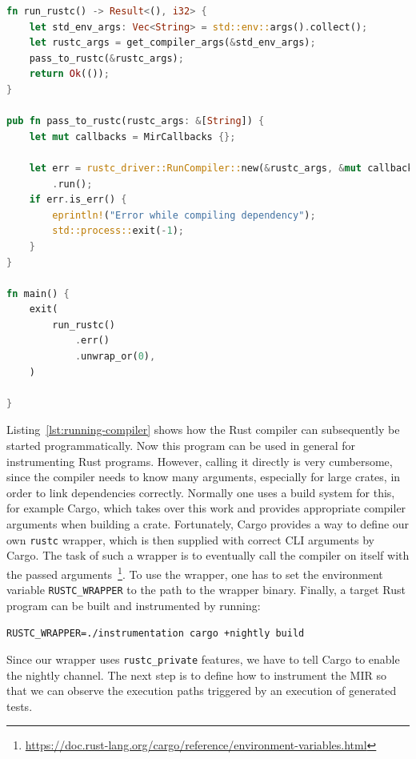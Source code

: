 \documentclass{article}
\begin{document}
\begin{lstlisting}[language=Rust, style=boxed, caption={Running the Rust compiler like a library}, label=lst:running-compiler]
fn run_rustc() -> Result<(), i32> {
    let std_env_args: Vec<String> = std::env::args().collect();
    let rustc_args = get_compiler_args(&std_env_args);
    pass_to_rustc(&rustc_args);
    return Ok(());
}

pub fn pass_to_rustc(rustc_args: &[String]) {
    let mut callbacks = MirCallbacks {};

    let err = rustc_driver::RunCompiler::new(&rustc_args, &mut callbacks)
        .run();
    if err.is_err() {
        eprintln!("Error while compiling dependency");
        std::process::exit(-1);
    }
}

fn main() {
    exit(
        run_rustc()
            .err()
            .unwrap_or(0),
    )

}
\end{lstlisting}

Listing~\ref{lst:running-compiler} shows how the Rust compiler can subsequently be started programmatically. Now this program can be used in general for instrumenting Rust programs. However, calling it directly is very cumbersome, since the compiler needs to know many arguments, especially for large crates, in order to link dependencies correctly. Normally one uses a build system for this, for example Cargo, which takes over this work and provides appropriate compiler arguments when building a crate. Fortunately, Cargo provides a way to define our own \lstinline{rustc} wrapper, which is then supplied with correct CLI arguments by Cargo. The task of such a wrapper is to eventually call the compiler on itself with the passed arguments~\footnote{\url{https://doc.rust-lang.org/cargo/reference/environment-variables.html}}. To use the wrapper, one has to set the environment variable \lstinline{RUSTC_WRAPPER} to the path to the wrapper binary. Finally, a target Rust program can be built and instrumented by running:

\lstinline{RUSTC_WRAPPER=./instrumentation cargo +nightly build}

Since our wrapper uses \lstinline{rustc_private} features, we have to tell Cargo to enable the nightly channel. The next step is to define how to instrument the \ac{MIR} so that we can observe the execution paths triggered by an execution of generated tests.

\end{document}
